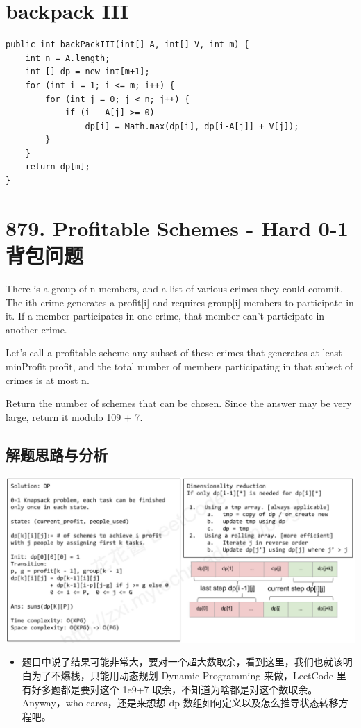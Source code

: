 \documentclass[9pt, b5paaper]{book}
\begin{document}
\section{backpack III}
\label{sec-1-25}
\begin{verbatim}
public int backPackIII(int[] A, int[] V, int m) {
    int n = A.length;
    int [] dp = new int[m+1];
    for (int i = 1; i <= m; i++) {
        for (int j = 0; j < n; j++) {
            if (i - A[j] >= 0)
                dp[i] = Math.max(dp[i], dp[i-A[j]] + V[j]);
        }
    }
    return dp[m];
}
\end{verbatim}

\section{879. Profitable Schemes - Hard 0-1背包问题}
\label{sec-1-26}
There is a group of n members, and a list of various crimes they could commit. The ith crime generates a profit[i] and requires group[i] members to participate in it. If a member participates in one crime, that member can't participate in another crime.

Let's call a profitable scheme any subset of these crimes that generates at least minProfit profit, and the total number of members participating in that subset of crimes is at most n.

Return the number of schemes that can be chosen. Since the answer may be very large, return it modulo 109 + 7.
\subsection{解题思路与分析}
\label{sec-1-26-1}

\includegraphics[width=.9\linewidth]{./pic/crime.png}

\begin{itemize}
\item 题目中说了结果可能非常大，要对一个超大数取余，看到这里，我们也就该明白为了不爆栈，只能用动态规划 Dynamic Programming 来做，LeetCode 里有好多题都是要对这个 1e9+7 取余，不知道为啥都是对这个数取余。Anyway，who cares，还是来想想 dp 数组如何定义以及怎么推导状态转移方程吧。
\end{itemize}
\end{document}
